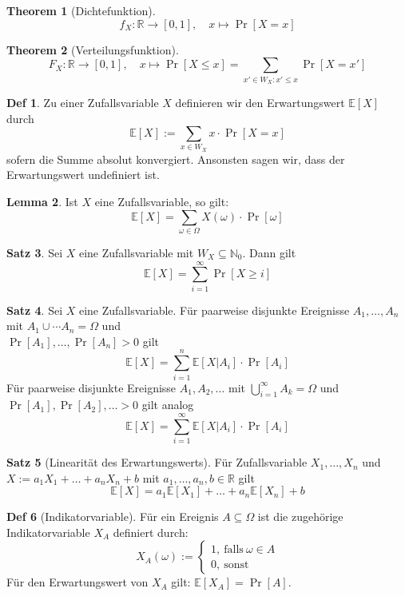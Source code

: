 \documentclass[a4paper, 10pt]{article}
\theoremstyle{definition}
\newtheorem{definition}{Def}[section]
\newtheorem{theorem}[definition]{Satz}
\newtheorem{nlemma}[definition]{Lemma}
\theoremstyle{named}
\newtheorem*{ntheorem}{Theorem}
\newcommand{\R}{\mathbb{R}}
\newcommand{\N}{\mathbb{N}}
\newcommand{\E}{\mathbb{E}}
\begin{document}
\begin{ntheorem}[Dichtefunktion]
    $$f_X: \R \to [0,1], \quad x \mapsto \Pr[X = x]$$
\end{ntheorem}

\begin{ntheorem}[Verteilungsfunktion]
    $$F_X: \R \to [0,1], \quad x \mapsto \Pr[X \leq x] = \sum_{x' \in W_X: x' \leq x} \Pr[X = x']$$
\end{ntheorem}

\setcounter{definition}{26}
\begin{definition}
    Zu einer Zufallsvariable $X$ definieren wir den Erwartungswert $\E[X]$ durch
    $$\E[X] := \sum_{x \in W_X} x \cdot \Pr[X = x]$$
    sofern die Summe absolut konvergiert. Ansonsten sagen wir, dass der Erwartungswert undefiniert ist.
\end{definition}

\setcounter{definition}{28}
\begin{nlemma}
    Ist $X$ eine Zufallsvariable, so gilt:
    $$\E[X] = \sum_{\omega \in \Omega} X(\omega) \cdot \Pr[\omega]$$
\end{nlemma}

\begin{theorem}
    Sei $X$ eine Zufallsvariable mit $W_X \subseteq \N_0$. Dann gilt
    $$\E[X] = \sum_{i = 1}^\infty \Pr[X \geq i]$$
\end{theorem}

\setcounter{definition}{31}
\begin{theorem}
    Sei $X$ eine Zufallsvariable. Für paarweise disjunkte Ereignisse $A_1, \ldots, A_n$ mit $A_1 \cup \cdots A_n = \Omega$ und \\ $\Pr[A_1], \ldots, \Pr[A_n] > 0$ gilt
    $$\E[X] = \sum_{i = 1}^n \E[X|A_i] \cdot \Pr[A_i]$$
    Für paarweise disjunkte Ereignisse $A_1, A_2, \ldots$ mit $\bigcup_{i=1}^\infty A_k = \Omega$ und $\Pr[A_1], \Pr[A_2], \ldots > 0$ gilt analog
    $$\E[X] = \sum_{i = 1}^\infty \E[X | A_i] \cdot \Pr[A_i]$$
\end{theorem}

\begin{theorem}[Linearität des Erwartungswerts]
    Für Zufallsvariable $X_1, \ldots, X_n$ und $X := a_1X_1 + \ldots + a_n X_n + b$ mit $a_1, \ldots, a_n, b \in \R$ gilt
    $$\E[X] = a_1 \E[X_1] + \ldots + a_n \E[X_n] + b$$
\end{theorem}

\setcounter{definition}{34}
\begin{definition}[Indikatorvariable]
    Für ein Ereignis $A \subseteq \Omega$ ist die zugehörige Indikatorvariable $X_A$ definiert durch:
    $$X_A(\omega) := \begin{cases}
        1, \ \text{falls} \ \omega \in A \\
        0, \ \text{sonst}
    \end{cases}$$
    Für den Erwartungswert von $X_A$ gilt: $\E[X_A] = \Pr[A]$.
\end{definition}
\end{document}
